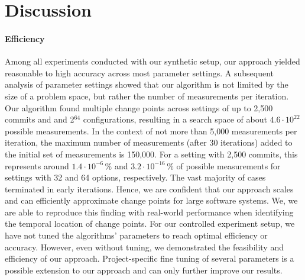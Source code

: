 \documentclass[sigconf]{acmart}
\begin{document}
	\section{Discussion}
	\paragraph{Efficiency} Among all experiments conducted with our synthetic setup, our approach yielded reasonable to high accuracy across most parameter settings. A subsequent analysis of parameter settings showed that our algorithm is not limited by the size of a problem space, but rather the number of measurements per iteration. Our algorithm found multiple change points across settings of up to 2,500 commits and and 2$^{64}$ configurations, resulting in a search space of about $4.6 \cdot 10^{22}$ possible measurements.
	In the context of not more than 5,000 measurements per iteration, the maximum number of measurements (after 30 iterations) added to the initial set of measurements is 150,000. For a setting with 2,500 commits, this represents around $1.4 \cdot 10^{-6}$\,\% and $3.2\cdot 10^{-16}$\,\% of possible measurements for settings with 32 and 64 options, respectively. The vast majority of cases terminated in early iterations. Hence, we are confident that our approach scales and can efficiently approximate change points for large software systems. We, we are able to reproduce this finding with real-world performance when identifying the temporal location of change points. For our controlled experiment setup, we have not tuned the algorithms’ parameters to reach optimal efficiency or accuracy. However, even without tuning, we demonstrated the feasibility and efficiency of our approach. Project-specific fine tuning of several parameters is a possible extension to our approach and can only further improve our results.
	
\end{document}
